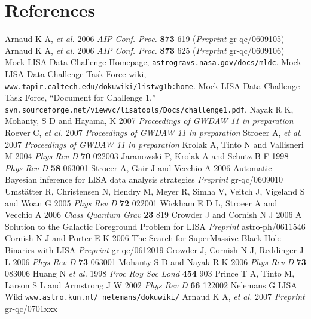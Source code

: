 \documentclass[12pt]{iopart}
\begin{document}
\section*{References}
\begin{thebibliography}{10}
 Arnaud K A, {\it et al.} 2006 {\it AIP Conf. Proc.} {\bf 873} 619 ({\it Preprint} gr-qc/0609105)
 Arnaud K A, {\it et al.} 2006 {\it AIP Conf. Proc.} {\bf 873} 625 ({\it Preprint} gr-qc/0609106)
 Mock LISA Data Challenge Homepage, {\tt astrogravs.nasa.gov/docs/mldc}.
 Mock LISA Data Challenge Task Force wiki, {\tt www.tapir.caltech.edu/dokuwiki/listwg1b:home}.
 Mock LISA Data Challenge Task Force, ``Document for Challenge 1,'' {\tt svn.sourceforge.net/viewvc/lisatools/Docs/challenge1.pdf}.
 Nayak R K, Mohanty, S D and Hayama, K 2007 {\it Proceedings of GWDAW 11} {\it in preparation}
 Roever C, {\it et al.} 2007 {\it Proceedings of GWDAW 11} {\it in preparation}
 Stroeer A, {\it et al.} 2007 {\it Proceedings of GWDAW 11} {\it in preparation}
 Krolak A, Tinto N and Vallisneri M 2004 {\it Phys Rev D} {\bf 70} 022003
 Jaranowski P, Krolak A and Schutz B F 1998 {\it Phys Rev D} {\bf 58} 063001
 Stroeer A, Gair J and Vecchio A 2006 Automatic Bayesian inference for LISA data analysis strategies {\it Preprint} gr-qc/0609010
 Umst\"{a}tter R, Christensen N, Hendry M, Meyer R, Simha V, Veitch J, Vigeland S and Woan G 2005 {\it Phys Rev D} {\bf 72} 022001
 Wickham E D L, Stroeer A and Vecchio A 2006 {\it Class Quantum Grav} {\bf 23} 819
 Crowder J and Cornish N J 2006 A Solution to the Galactic Foreground Problem for LISA {\it Preprint} astro-ph/0611546
 Cornish N J and Porter E K 2006 The Search for SuperMassive Black Hole Binaries with LISA {\it Preprint} gr-qc/0612019
 Crowder J, Cornish N J, Reddinger J L 2006 {\it Phys Rev D} {\bf 73} 063001
 Mohanty S D and Nayak R K 2006 {\it Phys Rev D} {\bf 73} 083006
 Huang N {\it et al.} 1998 {\it Proc Roy Soc Lond} {\bf 454} 903
 Prince T A, Tinto M, Larson S L and Armstrong J W 2002 {\it Phys Rev D} {\bf 66} 122002
 Nelemans G LISA Wiki {\tt www.astro.kun.nl/~nelemans/dokuwiki/}
 Arnaud K A, {\it et al.} 2007 {\it Preprint} gr-qc/0701xxx

\end{thebibliography}
\end{document}
